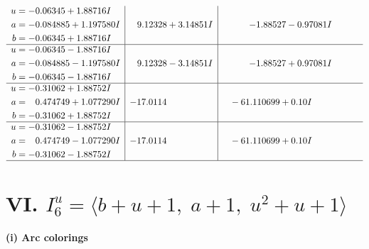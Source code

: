 \documentclass[1p]{elsarticle_modified}
\theoremstyle{definition}
\begin{document}
$$\begin{array}{c|c|c}
\begin{aligned}
u &= -0.06345 + 1.88716 I \\
a &= -0.084885 + 1.197580 I \\
b &= -0.06345 + 1.88716 I\end{aligned}
 & \phantom{-}9.12328 + 3.14851 I & -1.88527 - 0.97081 I \\ \hline\begin{aligned}
u &= -0.06345 - 1.88716 I \\
a &= -0.084885 - 1.197580 I \\
b &= -0.06345 - 1.88716 I\end{aligned}
 & \phantom{-}9.12328 - 3.14851 I & -1.88527 + 0.97081 I \\ \hline\begin{aligned}
u &= -0.31062 + 1.88752 I \\
a &= \phantom{-}0.474749 + 1.077290 I \\
b &= -0.31062 + 1.88752 I\end{aligned}
 & -17.0114\phantom{ +0.000000I} & \phantom{-}                -6
1.110699 + 0. 10   I\phantom{ +0.000000I} \\ \hline\begin{aligned}
u &= -0.31062 - 1.88752 I \\
a &= \phantom{-}0.474749 - 1.077290 I \\
b &= -0.31062 - 1.88752 I\end{aligned}
 & -17.0114\phantom{ +0.000000I} & \phantom{-}                -6
1.110699 + 0. 10   I\phantom{ +0.000000I}\\
 \hline 
 \end{array}$$\newpage\newpage\renewcommand{\arraystretch}{1}
\centering \section*{VI. $I^u_{6}= \langle b+u+1,\;a+1,\;u^2+u+1 \rangle$}
\flushleft \textbf{(i) Arc colorings}\\
\end{document}
